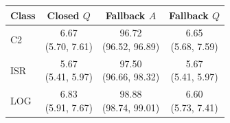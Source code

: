 \begin{tabular}{@{}lccc@{}}
\toprule
Class & Closed $Q$ & Fallback $A$ & Fallback $Q$\\
\midrule
C2 & \shortstack{6.67\\(5.70, 7.61)} & \shortstack{96.72\\(96.52, 96.89)} & \shortstack{6.65\\(5.68, 7.59)}\\[3pt]
ISR & \shortstack{5.67\\(5.41, 5.97)} & \shortstack{97.50\\(96.66, 98.32)} & \shortstack{5.67\\(5.41, 5.97)}\\[3pt]
LOG & \shortstack{6.83\\(5.91, 7.67)} & \shortstack{98.88\\(98.74, 99.01)} & \shortstack{6.60\\(5.73, 7.41)}\\[3pt]
\bottomrule
\end{tabular}
